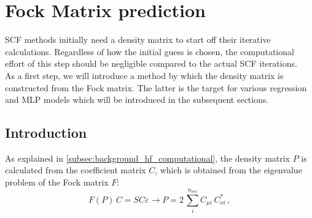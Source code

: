 \chapter{Fock Matrix prediction}
\label{chap:fock_matrix_predictions}

SCF methods initially need a density matrix to start off their iterative calculations. Regardless of how the initial guess is chosen, the computational effort of this step should be negligible compared to the actual SCF iterations.\\
As a first step, we will introduce a method by which the density matrix is constructed from the Fock matrix. The latter is the target for various regression and MLP models which will be introduced in the subsequent sections.


\section{Introduction}
\label{sec:Fock_mathcalrix_prediction_intro}
As explained in \autoref{subsec:background_hf_computational}, the density matrix $P$ is calculated from the coefficient matrix $C$, which is obtained from the eigenvalue problem of the Fock matrix $F$:
\begin{equation}
    \label{eq:density_reconstruction_from_fock}
    F(P)\,C = SC\varepsilon \rightarrow P = 2\,\sum_{i}^{n_{occ}} C_{\mu i}\,C^*_{\nu i}\,,%
\end{equation}

